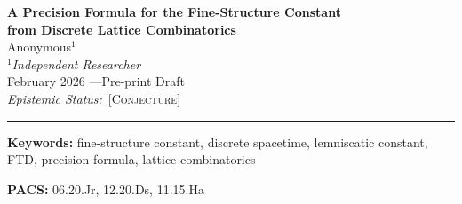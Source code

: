 \documentclass[11pt,twoside]{article}
\theoremstyle{remark}
\newcommand{\etag}[1]{\textsc{\small[#1]}}
\newcommand{\conj}{\etag{Conjecture}}
\newcommand{\eps}{\varepsilon}
\newcommand{\xp}{x_{+}}
\newcommand{\inv}{\alpha^{-1}}
\begin{document}
\begin{center}
    {\LARGE\bfseries A Precision Formula for the Fine-Structure Constant\\[0.15cm]
    from Discrete Lattice Combinatorics}\\[0.7cm]
    {\large Anonymous$^{1}$}\\[0.3cm]
    {\normalsize $^{1}$\textit{Independent Researcher}}\\[0.5cm]
    {\small February 2026 \quad---\quad Pre-print Draft}\\[0.15cm]
    {\small\textit{Epistemic Status:}\ \conj}
\end{center}

\vspace{0.3cm}
\hrule height 0.5pt
\vspace{0.6cm}

\begin{abstract}
\noindent We present a closed-form analytic formula for the fine-structure constant~$\alpha$ that achieves sub-parts-per-trillion agreement with the CODATA~2022 recommended value.
The formula extends the Foundational Ternary Dynamics (FTD) master quadratic---whose larger root $\xp \approx 137.036$ already approximates $\inv$ to 1.26\,ppm---by applying a four-term correction series in the small parameter $\eps = e^{\pi} - \pi - 20 \approx -9.0 \times 10^{-4}$.
Each correction coefficient is an exact rational number constructed from the FTD framework integers $\{3, 4, 7, 13\}$ and the constrained vacuum mode count $D = 47$.
The resulting formula yields $\inv = 137.035\,999\,177\,000\,04...\,$, matching the CODATA~2022 central value of $137.035\,999\,177(21)$ to a residual of $4.1 \times 10^{-14}$, well within experimental uncertainty.
We present this as a conjectured numerical identity, discuss the combinatorial origins of the correction coefficients within the FTD framework, and derive a falsifiable prediction for future precision measurements of $\alpha$.
\end{abstract}

\vspace{0.3cm}
\noindent\textbf{Keywords:} fine-structure constant, discrete spacetime, lemniscatic constant, FTD, precision formula, lattice combinatorics

\vspace{0.3cm}
\noindent\textbf{PACS:} 06.20.Jr, 12.20.Ds, 11.15.Ha

\tableofcontents

\end{document}
